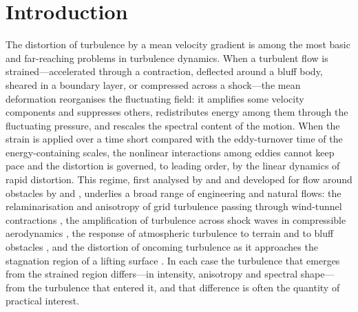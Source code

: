 \documentclass[lineno]{JFM-FLM_Au}
\begin{document}
\section{Introduction}\label{sec:intro}

The distortion of turbulence by a mean velocity gradient is among the most
basic and far-reaching problems in turbulence dynamics. When a turbulent flow
is strained---accelerated through a contraction, deflected around a bluff body,
sheared in a boundary layer, or compressed across a shock---the mean
deformation reorganises the fluctuating field: it amplifies some velocity
components and suppresses others, redistributes energy among them through the
fluctuating pressure, and rescales the spectral content of the motion. When the
strain is applied over a time short compared with the eddy-turnover time of the
energy-containing scales, the nonlinear interactions among eddies cannot keep
pace and the distortion is governed, to leading order, by the linear dynamics
of rapid distortion. This regime, first analysed by
\citet{BatchelorProudman1954} and \citet{TownsendBook} and developed for flow
around obstacles by \citet{Hunt1973} and \citet{Goldstein1978}, underlies a
broad range of engineering and natural flows: the relaminarisation and
anisotropy of grid turbulence passing through wind-tunnel contractions
\citep{MillsCorrsin1959,TuckerReynolds1968,LeeReynolds1985}, the amplification
of turbulence across shock waves in compressible aerodynamics
\citep{Ribner1953}, the response of atmospheric turbulence to
terrain and to bluff obstacles \citep{HuntCarruthers1990,Britter1981}, and the
distortion of oncoming turbulence as it approaches the stagnation region of a
lifting surface \citep{HuntGraham1978,GoldsteinAtassi1976}. In each case the
turbulence that emerges from the strained region differs---in intensity,
anisotropy and spectral shape---from the turbulence that entered it, and that
difference is often the quantity of practical interest.
\end{document}
